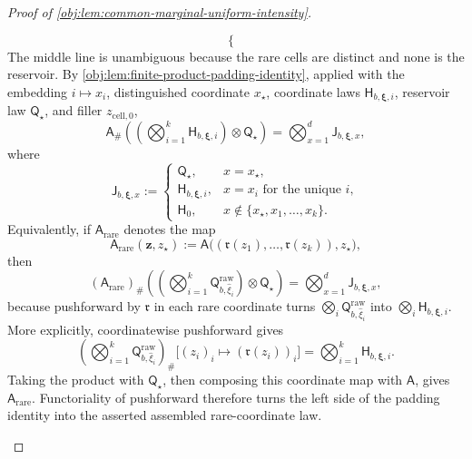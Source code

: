 \begin{proof}[Proof of \cref{obj:lem:common-marginal-uniform-intensity}]
\begin{enumerate}
\[\begin{cases}
\end{cases}
\]
The middle line is unambiguous because the rare cells are distinct and none is the reservoir. By \cref{obj:lem:finite-product-padding-identity}, applied with the embedding \(i\mapsto x_i\), distinguished coordinate \(x_\star\), coordinate laws \(\mathsf H_{b,\boldsymbol\xi,i}\), reservoir law \(\mathsf Q_\star\), and filler \(z_{\mathrm{cell},0}\),
\[
\mathsf A_\#\left(\left(\bigotimes_{i=1}^k
\mathsf H_{b,\boldsymbol\xi,i}\right)\otimes\mathsf Q_\star\right)
=
\bigotimes_{x=1}^d \mathsf J_{b,\boldsymbol\xi,x},
\]
where
\[
\mathsf J_{b,\boldsymbol\xi,x}
:=
\begin{cases}
\mathsf Q_\star, & x=x_\star,\\
\mathsf H_{b,\boldsymbol\xi,i}, & x=x_i\text{ for the unique }i,\\
\mathsf H_0, & x\notin\{x_\star,x_1,\ldots,x_k\}.
\end{cases}
\]
Equivalently, if \(\mathsf A_{\mathrm{rare}}\) denotes the map
\[
\mathsf A_{\mathrm{rare}}(\boldsymbol z,z_\star)
:=
\mathsf A\bigl((\mathfrak r(z_1),\ldots,\mathfrak r(z_k)),z_\star\bigr),
\]
then
\[
(\mathsf A_{\mathrm{rare}})_\#\left(\left(\bigotimes_{i=1}^k
\mathsf Q^{\mathrm{raw}}_{b,\widehat\xi_i}\right)\otimes\mathsf Q_\star\right)
=
\bigotimes_{x=1}^d \mathsf J_{b,\boldsymbol\xi,x},
\]
because pushforward by \(\mathfrak r\) in each rare coordinate turns \(\bigotimes_i\mathsf Q^{\mathrm{raw}}_{b,\widehat\xi_i}\) into \(\bigotimes_i\mathsf H_{b,\boldsymbol\xi,i}\).
More explicitly, coordinatewise pushforward gives
\[
\left(\bigotimes_{i=1}^k
\mathsf Q^{\mathrm{raw}}_{b,\widehat\xi_i}\right)_\#
\bigl[(z_i)_i\mapsto(\mathfrak r(z_i))_i\bigr]
=
\bigotimes_{i=1}^k\mathsf H_{b,\boldsymbol\xi,i}.
\]
Taking the product with \(\mathsf Q_\star\), then composing this coordinate map with
\(\mathsf A\), gives \(\mathsf A_{\mathrm{rare}}\). Functoriality of pushforward therefore turns
the left side of the padding identity into the asserted assembled rare-coordinate law.


\end{enumerate}
\end{proof}
